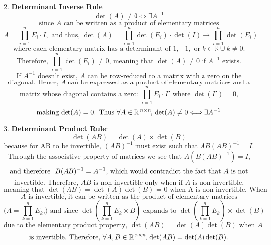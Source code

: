 \documentclass{article}
\begin{document}
2. \textbf{Determinant Inverse Rule}
\[
\det(A) \neq 0 \Longleftrightarrow \exists A^{-1}
\]
\[
\text{since } A \text{ can be written as a product of elementary matrices}
\]
\[
A = \prod_{i=1}^{n} E_i \cdot I, \text{ and thus, }
\det(A) = \prod_{i=1}^{n} \det(E_i) \cdot \det(I) \rightarrow \prod_{i=1}^{n} \det(E_i)
\]
\[
\text{where each elementary matrix has a determinant of } 1, -1, \text{ or } k \in \mathbb{R} \cup k \neq 0.
\]
\[
\text{Therefore, $\prod_{i=1}^{n} \det(E_i) \neq 0$, meaning that $\det(A) \neq 0$ if $A^{-1}$ exists.}
\]
\[
\text{If } A^{-1} \text{ doesn't exist, } A \text{ can be row-reduced to a matrix with a zero on the}
\]
\[
\text{diagonal. Hence, $A$ can be expressed as a product of elementary matrices and a}
\]
\[
\text{matrix whose diagonal contains a zero: $\prod_{i=1}^{n} E_i \cdot I'$ where $\det(I') = 0$,}
\]
\[
\text{making $\det(A) = 0$. Thus $\forall A \in \mathbb{R}^{\hspace{0.5mm}n \times n}$\hspace{-0.5mm}, $\det(A) \neq 0 \Longleftrightarrow \exists A^{-1}$}
\]

3. \textbf{Determinant Product Rule}:
\[
\text{$\det(AB) = \det(A) \times \det(B)$}
\]
\[
\text{because for AB to be invertible, $(AB)^{-1}$ must exist such that $AB (AB)^{-1} = I$.}
\]
\[
\text{Through the associative property of matrices we see that $A \left( B (AB)^{-1} \right) = I$,}
\]
\[
\vspace{1mm}
\text{and therefore ‌ $B (AB)^{-1} = A^{-1}$, which would contradict the fact that $A$ is not}
\]
\[
\text{invertible. Therefore, $AB$ is non-invertible only when if $A$ is non-invertible,}
\]
\[
\text{meaning that $\det(AB)  = \det(A)\det(B)$ = 0 when A is non-invertible. When}
\]
\[
\text{$A$ is invertible, it can be written as the product of elementary matrices}
\]
\[
\text{($A = \prod_{k=1}^{n} E_k$,) and since $\det(\prod_{k=1}^{n} E_k \times B)$ expands to $\det(\prod_{k=1}^{n} E_k) \times \det(B)$}
\]
\[
\text{due to the elementary product property, $\det(AB) = \det(A)\det(B)$ when $A$}
\]
\[
\text{is invertible. Therefore, $\forall A, B \in \mathbb{R}^{\hspace{0.5mm}n \times n}$\hspace{-0.5mm}, $\det(AB) = \det(A) \det(B)$.}
\]
\end{document}
